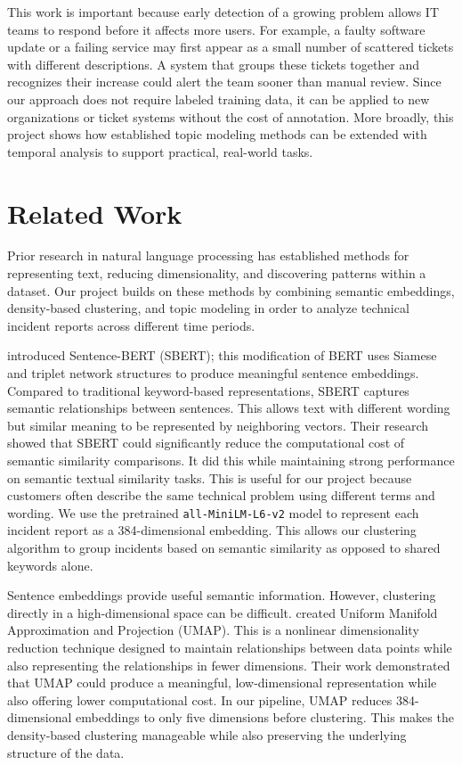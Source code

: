 \documentclass[11pt]{article}
\begin{document}
This work is important because early detection of a growing problem allows IT teams to respond before it affects more users. For example, a faulty software update or a failing service may first appear as a small number of scattered tickets with different descriptions. A system that groups these tickets together and recognizes their increase could alert the team sooner than manual review. Since our approach does not require labeled training data, it can be applied to new organizations or ticket systems without the cost of annotation. More broadly, this project shows how established topic modeling methods can be extended with temporal analysis to support practical, real-world tasks.

\section{Related Work}
Prior research in natural language processing has established methods for representing text, reducing dimensionality, and discovering patterns within a dataset. Our project builds on these methods by combining semantic embeddings, density-based clustering, and topic modeling in order to analyze technical incident reports across different time periods.

\citet{reimers2019sentence} introduced Sentence-BERT (SBERT); this modification of BERT uses Siamese and triplet network structures to produce meaningful sentence embeddings. Compared to traditional keyword-based representations, SBERT captures semantic relationships between sentences. This allows text with different wording but similar meaning to be represented by neighboring vectors. Their research showed that SBERT could significantly reduce the computational cost of semantic similarity comparisons. It did this while maintaining strong performance on semantic textual similarity tasks. This is useful for our project because customers often describe the same technical problem using different terms and wording. We use the pretrained \texttt{all-MiniLM-L6-v2} model to represent each incident report as a 384-dimensional embedding. This allows our clustering algorithm to group incidents based on semantic similarity as opposed to shared keywords alone.

Sentence embeddings provide useful semantic information. However, clustering directly in a high-dimensional space can be difficult. \citet{mcinnes2018umap} created Uniform Manifold Approximation and Projection (UMAP). This is a nonlinear dimensionality reduction technique designed to maintain relationships between data points while also representing the relationships in fewer dimensions. Their work demonstrated that UMAP could produce a meaningful, low-dimensional representation while also offering lower computational cost. In our pipeline, UMAP reduces 384-dimensional embeddings to only five dimensions before clustering. This makes the density-based clustering manageable while also preserving the underlying structure of the data.
\end{document}
